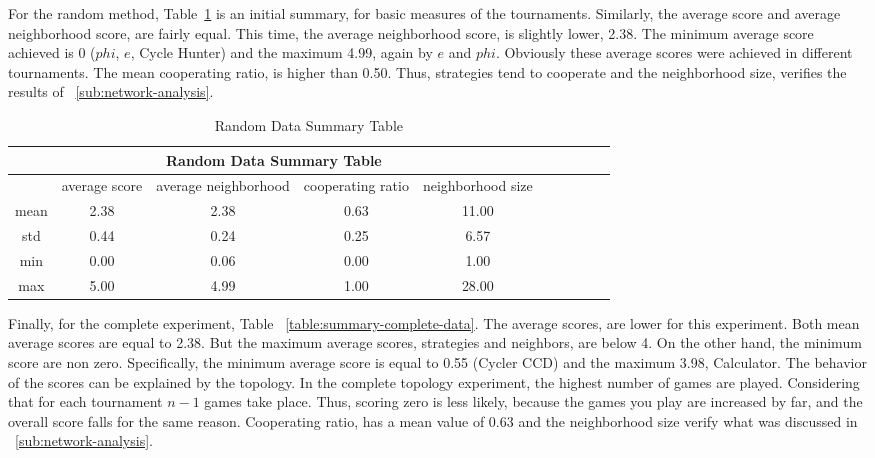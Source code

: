 For the random method, Table~\ref{summary-random-data} is an initial summary,
for basic measures of the tournaments. Similarly, the average score and average
neighborhood score, are fairly equal. This time, the average neighborhood score,
is slightly lower, 2.38. The minimum average score achieved is 0 ($phi$, $e$, Cycle Hunter)
and the maximum 4.99, again by $e$ and $phi$. Obviously these average scores were achieved in
different tournaments. The mean cooperating ratio, is higher than 0.50.
Thus, strategies tend to cooperate and the neighborhood size, verifies the results
of ~\autoref{sub:network-analysis}.

\begin{table}[!hbtp]
	\centering
	\begin{adjustbox}{width=0.8\textwidth}
		\small
		\begin{tabular}{cccccccccc}
				\toprule
			\multicolumn{5}{|c|}{Random Data Summary Table}                                      \\ \hline
			     & average score & average neighborhood & cooperating ratio & neighborhood size \\ \hline
			mean & 2.38          & 2.38                 & 0.63              & 11.00             \\ \hline
			std  & 0.44          & 0.24                 & 0.25              & 6.57              \\ \hline
			min  & 0.00          & 0.06                 & 0.00              & 1.00              \\ \hline
			max  & 5.00          & 4.99                 & 1.00              & 28.00             \\ \bottomrule
		\end{tabular}
	\end{adjustbox}
	\caption{Random Data Summary Table}
	\label{summary-random-data}
\end{table}

Finally, for the complete experiment, Table ~\ref{table:summary-complete-data}. The
average scores, are lower for this experiment. Both mean average scores are
equal to 2.38. But the maximum average scores, strategies and neighbors, are
below 4. On the other hand, the minimum score are non zero. Specifically,
the minimum average score is equal to 0.55 (Cycler CCD) and the maximum 3.98, Calculator.
The behavior of the scores can be explained by the topology. In the complete topology experiment,
the highest number of games are played. Considering that for each tournament
\(n-1\) games take place. Thus, scoring zero is less likely, because the games
you play are increased by far, and the overall score falls for the same reason.
Cooperating ratio, has a mean value of 0.63 and the neighborhood size
verify what was discussed in ~\autoref{sub:network-analysis}.

